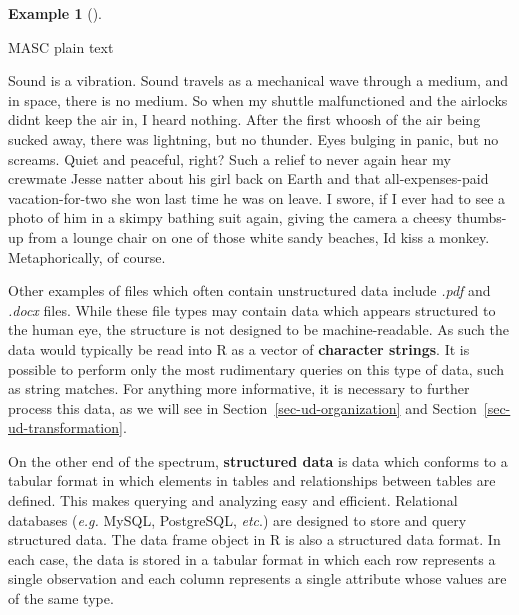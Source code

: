 \documentclass[
  letterpaper,
  DIV=11,
  numbers=noendperiod]{scrreprt}
\newenvironment{Shaded}{\begin{snugshade}}{\end{snugshade}}
\newcommand{\NormalTok}[1]{\textcolor[rgb]{0.00,0.00,0.00}{#1}}
\theoremstyle{definition}
\newtheorem{example}{Example}[chapter]
\theoremstyle{remark}
\begin{document}
\begin{example}[]\protect\hypertarget{exm-masc-text}{}\label{exm-masc-text}

MASC plain text

\begin{Shaded}
\begin{Highlighting}[]
\NormalTok{Sound is a vibration. Sound travels as a mechanical wave through a medium, and in space, there is no}
\NormalTok{medium. So when my shuttle malfunctioned and the airlocks didn\textquotesingle{}t keep the air in, I heard nothing. After the}
\NormalTok{first whoosh of the air being sucked away, there was lightning, but no thunder. Eyes bulging in}
\NormalTok{panic, but no screams. Quiet and peaceful, right? Such a relief to never again hear my crewmate Jesse natter}
\NormalTok{about his girl back on Earth and that all{-}expenses{-}paid vacation{-}for{-}two she won last time he was on leave. I}
\NormalTok{swore, if I ever had to see a photo of him in a skimpy bathing suit again, giving the camera a cheesy thumbs{-}up}
\NormalTok{from a lounge chair on one of those white sandy beaches, I\textquotesingle{}d kiss a monkey. Metaphorically, of course.}
\end{Highlighting}
\end{Shaded}

\end{example}

Other examples of files which often contain unstructured data include
\emph{.pdf} and \emph{.docx} files. While these file types may contain
data which appears structured to the human eye, the structure is not
designed to be machine-readable. As such the data would typically be
read into R as a vector of \textbf{character strings}. It is possible to
perform only the most rudimentary queries on this type of data, such as
string matches. For anything more informative, it is necessary to
further process this data, as we will see in
Section~\ref{sec-ud-organization} and
Section~\ref{sec-ud-transformation}.

On the other end of the spectrum, \textbf{structured data} is data which
conforms to a tabular format in which elements in tables and
relationships between tables are defined. This makes querying and
analyzing easy and efficient. Relational databases (\emph{e.g.} MySQL,
PostgreSQL, \emph{etc}.) are designed to store and query structured
data. The data frame object in R is also a structured data format. In
each case, the data is stored in a tabular format in which each row
represents a single observation and each column represents a single
attribute whose values are of the same type.
\end{document}

